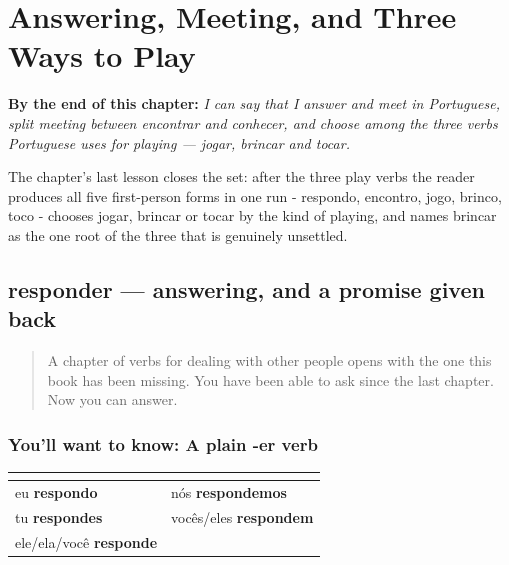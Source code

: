 
\chapter{Answering, Meeting, and Three Ways to Play}
\label{ch:pt-answering-meeting-playing}

\begin{chapteropening}
\textbf{By the end of this chapter:} \emph{I can say that I answer and meet in Portuguese, split meeting between encontrar and conhecer, and choose among the three verbs Portuguese uses for playing — jogar, brincar and tocar.}

The chapter's last lesson closes the set: after the three play verbs the reader produces all five first-person forms in one run - respondo, encontro, jogo, brinco, toco - chooses jogar, brincar or tocar by the kind of playing, and names brincar as the one root of the three that is genuinely unsettled.
\end{chapteropening}

\section[responder]{responder — answering, and a promise given back}

\label{lesson:PT-C22-responder}



\begin{quote}
A chapter of verbs for dealing with other people opens with the one this book has been missing. You have been able to ask since the last chapter. Now you can answer.
\end{quote}

\subsection*{You'll want to know: A plain -er verb}
\noindent
\begin{tabularx}{\linewidth}{@{}>{\raggedright\arraybackslash}X>{\raggedright\arraybackslash}X@{}}
\toprule
\textbf{} & \textbf{} \\
\midrule
eu \textbf{respondo} & nós \textbf{respondemos} \\
tu \textbf{respondes} & vocês/eles \textbf{respondem} \\
ele/ela/você \textbf{responde} &  \\
\bottomrule
\end{tabularx}

